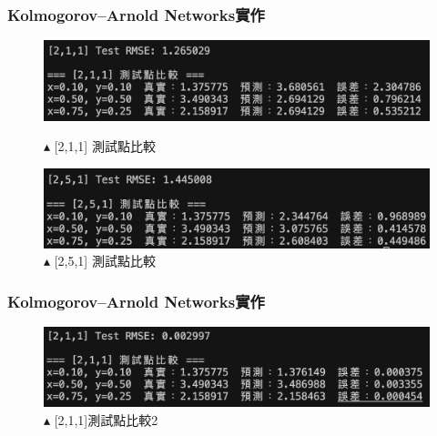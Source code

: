 \documentclass{beamer}
\begin{document}
\begin{frame}
    \frametitle{Kolmogorov–Arnold Networks實作}
    \begin{figure}
        \centering
        \begin{minipage}{\textwidth}
            \includegraphics[width=1\textwidth,height=0.4\textheight,keepaspectratio]{figures/211_3.jpg}
            \centering
            \caption*{$\blacktriangle$ [2,1,1] 測試點比較}
        \end{minipage}
        
        \vspace{0.5em}
        
        \begin{minipage}{\textwidth}
            \includegraphics[width=1\textwidth,height=0.4\textheight,keepaspectratio]{figures/251.jpg}
            \centering
            \caption*{$\blacktriangle$ [2,5,1] 測試點比較}
        \end{minipage}
    \end{figure}
\end{frame}

\begin{frame}
    \frametitle{Kolmogorov–Arnold Networks實作}
    \begin{figure}
        \centering
        \includegraphics[width=1\textwidth,height=0.4\textheight,keepaspectratio]{figures/211比較2.jpg}
        \centering
        \caption*{$\blacktriangle$ [2,1,1]測試點比較2}
    \end{figure}
\end{frame}
\end{document}
